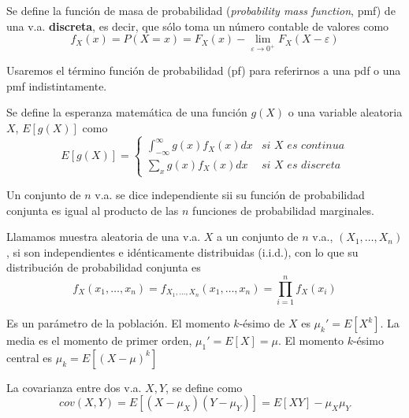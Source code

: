 \begin{definicion}
	Se define la función de masa de probabilidad  (\textit{probability mass function}, pmf) de una v.a. \textbf{discreta}, es decir, que sólo toma un número contable de valores como
	\[ 
	f_X(x) = P(X=x) = 
		F_X(x) - 
		\lim_{\varepsilon \rightarrow 0^+} F_X(X-\varepsilon)
	\]
\end{definicion}

	Usaremos el término función de probabilidad (pf) para referirnos a una pdf o una pmf indistintamente.
	
\begin{definicion}
	Se define la esperanza matemática de una función $g(X)$ o una variable aleatoria $X$, $E[g(X)]$ como
	\[ E[g(X)] = \left\lbrace 
		\begin{array}{cc}
		\int_{-\infty}^{\infty} g(x)f_X(x) dx &
			\textit{si } X \textit{ es continua} \\
		\sum\limits_{x} g(x)f_X(x) dx &
			\textit{si } X \textit{ es discreta}	
		\end{array}\right.
	\]
\end{definicion}

\begin{definicion}[Independencia]
	Un conjunto de $n$ v.a. se dice independiente sii su función de probabilidad conjunta es igual al producto de las $n$ funciones de probabilidad marginales.
\end{definicion}

\begin{definicion}
	Llamamos muestra aleatoria de una v.a. $X$ a un conjunto de $n$ v.a., $(X_1, \dots, X_n)$, si son independientes e idénticamente distribuidas (i.i.d.), con lo que su distribución de probabilidad conjunta es
	\[ 
		f_{X}(x_1, \dots, x_n) =
		f_{X_1, \dots, X_n}(x_1, \dots, x_n) =
		\prod\limits_{i=1}^n f_X(x_i)
	\]
\end{definicion}
	
\begin{definicion}[Momento]
	Es un parámetro de la población. El momento $k$-ésimo de $X$ es $\mu_k' = E[X^k]$. La media es el momento de primer orden, $\mu_1' = E[X] = \mu$. El momento $k$-ésimo central es $\mu_k = E[(X - \mu)^k]$
\end{definicion}

\begin{definicion}[Covarianza]
	La covarianza entre dos v.a. $X,Y$, se define como
		\[	cov(X,Y) = E[(X-\mu_X) (Y-\mu_Y)] = 
						E[XY] - \mu_X \mu_Y 
		\]
\end{definicion}

